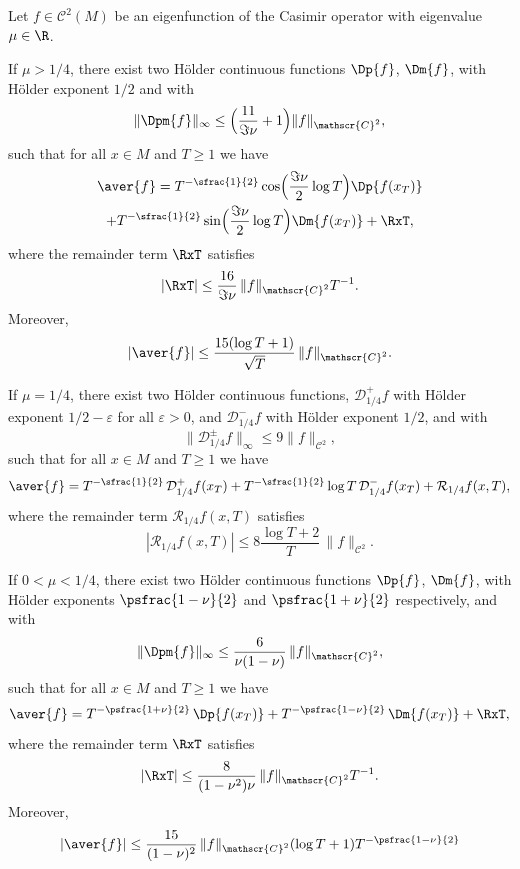 \begin{theorem}\label{thm:main1}
Let $f \in \mathscr{C}^2(M)$ be an eigenfunction of the Casimir operator with eigenvalue $\mu \in \R$.
\begin{enumeratei}
\item\label{thm:main1i}
If $\mu > 1/4$, there exist two Hölder continuous functions $\Dp{f}$, $\Dm{f}$, with Hölder exponent $1/2$ and with
\[
\|\Dpm{f} \|_{\infty} \leq \Bigl(\frac{11}{\Im \nu} + 1 \Bigr) \|f\|_{\mathscr{C}^2},
\]
such that for all $x \in M$ and $T \geq 1$ we have
\begin{multline*}
\aver{f} = T^{-\sfrac{1}{2}} \cos\Bigl(\frac{\Im \nu}{2} \log T \Bigr) \Dp{ f(x_T)}\\
+ T^{-\sfrac{1}{2}} \sin\Bigl(\frac{\Im \nu}{2} \log T \Bigr) \Dm{ f(x_T)}+ \RxT,
\end{multline*}
where the remainder term $\RxT$ satisfies
\[
|\RxT|\leq \frac{16}{\Im \nu}\, \|f\|_{\mathscr{C}^2} T^{-1}.
\]
Moreover,
\begin{equation}\label{eq:aux_thm_1_princ}
|\aver{f}|\leq \frac{15(\log T +1)}{\sqrt{T}}\, \|f\|_{\mathscr{C}^2}.
\end{equation}

\item\label{thm:main1ii}
If $\mu = 1/4$, there exist two Hölder continuous functions, $\mathcal{D}^{+}_{1/4}f$ with Hölder exponent $1/2 - \varepsilon$ for all $\varepsilon >0$, and $\mathcal{D}^{-}_{1/4}f$ with Hölder exponent $1/2$, and with
\[
\|\mathcal{D}^{\pm}_{1/4}f \|_{\infty} \leq 9 \|f\|_{\mathscr{C}^2},
\]
such that for all $x \in M$ and $T \geq 1$ we have
\[
\aver{f} = T^{-\sfrac{1}{2}} \, \mathcal{D}^{+}_{1/4} f(x_T) + T^{-\sfrac{1}{2}} \log T \, \mathcal{D}^{-}_{1/4} f(x_T) +\mathcal{R}_{1/4}f(x,T),
\]
where the remainder term $\mathcal{R}_{1/4}f(x,T)$ satisfies
\[
|\mathcal{R}_{1/4}f(x,T)|\leq 8 \frac{\log T +2}{T}\, \|f\|_{\mathscr{C}^2}.
\]

\item\label{thm:main1iii}
If $0< \mu < 1/4$, there exist two Hölder continuous functions $\Dp{f}$, $\Dm{f}$, with Hölder exponents $\psfrac{1-\nu}{2} $ and $\psfrac{1+\nu}{2} $ respectively, and with
\[
\|\Dpm{f} \|_{\infty} \leq \frac{6}{\nu(1-\nu)}\, \|f\|_{\mathscr{C}^2},
\]
such that for all $x \in M$ and $T \geq 1$ we have
\[
\aver{f} = T^{-\psfrac{1+\nu}{2}} \, \Dp{f(x_T) } + T^{-\psfrac{1-\nu}{2}} \, \Dm{ f(x_T)} + \RxT,
\]
where the remainder term $\RxT$ satisfies
\[
|\RxT|\leq \frac{8}{(1-\nu^2) \nu}\, \|f\|_{\mathscr{C}^2} T^{-1}.
\]
Moreover,
\begin{equation}\label{eq:aux_thm_1_comp}
|\aver{f}|\leq \frac{15}{(1-\nu)^2}\, \|f\|_{\mathscr{C}^2} (\log T +1) T^{-\psfrac{1-\nu}{2}}
\end{equation}


\end{enumeratei}
\end{theorem}

